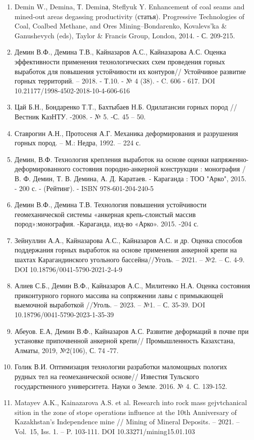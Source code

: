 \begin{enumerate}
\def\labelenumi{\arabic{enumi}.}
\item
  Demin W., Demina, Т. Deminа, Steflyuk Y. Enhancement of coal seams and
  mined-out areas degassing productivity (статья). Progressive
  Technologies of Coal, Coalbed Methane, and Ores Mining--Bondarenko,
  Kovalevs'ka \& Ganushevych (eds), Taylor \& Francis Group, London,
  2014. - С. 209-215.
\item
  Демин В.Ф., Демина Т.В., Кайназаров А.С., Кайназарова А.С. Оценка
  эффективности применения технологических схем проведения горных
  выработок для повышения устойчивости их контуров// Устойчивое развитие
  горных территорий. -- 2018. - Т.10. - № 4 (38). - C. 606 - 617. DOI
  10.21177/1998-4502-2018-10-4-606-616
\item
  Цай Б.Н., Бондаренко Т.Т., Бахтыбаев Н.Б. Одилатансии горных пород //
  Вестник КазНТУ. -2008. - № 5. -С. 45 -- 50.
\item
  Ставрогин А.Н., Протосеня А.Г. Механика деформирования и разрушения
  горных пород. -- М.: Недра, 1992. -- 224 с.
\item
  Демин, В.Ф. Технология крепления выработок на основе оценки
  напряженно-деформированного состояния породно-анкерной конструкции :
  монография / В. Ф. Демин, Т. В. Демина, А. Д. Каратаев. - Караганда :
  ТОО "Арко", 2015. - 200 с. - (Рейтинг). - ISBN 978-601-204-240-5
\item
  Демин В.Ф., Демина Т.В. Технология повышения устойчивости
  геомеханической системы «анкерная крепь-слоистый массив
  пород»:монография. -Караганда, изд-во «Арко». 2015. -204 с.
\item
  Зейнуллин А.А., Кайназарова А.С., Кайназаров А.С. и др. Оценка
  способов поддержания горных выработок на основе применения анкерной
  крепи на шахтах Карагандинского угольного бассейна//Уголь. -- 2021. --
  №2. -- С. 4-9. DOI 10.18796/0041-5790-2021-2-4-9
\item
  Алиев С.Б., Демин В.Ф., Кайназаров А.С., Милитенко Н.А. Оценка
  состояния приконтурного горного массива на сопряжении лавы с
  примыкающей выемочной выработкой //Уголь. -- 2023. -- №1. -- С. 35-39.
  DOI 10.18796/0041-5790-2023-1-35-39
\item
  Абеуов. Е.А, Демин В.Ф., Кайназаров А.С. Развитие деформаций в почве
  при установке припочвенной анкерной крепи// Промышленность Казахстана,
  Алматы, 2019, №2(106), С. 74 -77.
\item
  Голик В.И. Оптимизация технологии разработки маломощных пологих рудных
  тел на геомеханической основе// Известия Тульского государственного
  университета. Науки о Земле. 2016. № 4. С. 139-152.
\item
  Matayev A.K., Kainazarova A.S. et al. Research into rock mass
  gejvtchanical sition in the zone of stope operations influence at the
  10th Anniversary of Kazakhstan's Independence mine // Mining of
  Mineral Deposits. -- 2021. -- Vol.~15, Iss. 1. -- P. 103-111. DOI
  10.33271/mining15.01.103
\end{enumerate}

